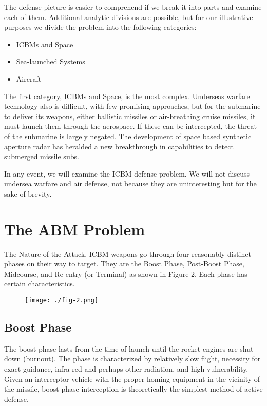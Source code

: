 The defense picture is easier to comprehend if we break it into parts and examine each of them. Additional analytic divisions are possible, but for our illustrative purposes we divide the problem into the following categories:
\begin{itemize}
    \item ICBMs and Space
    \item Sea-launched Systems
    \item Aircraft
\end{itemize}

The first category, ICBMs and Space, is the most complex. Underseas warfare technology also is difficult, with few promising approaches, but for the submarine to deliver its weapons, either ballistic missiles or air-breathing cruise missiles, it must launch them through the aerospace. If these can be intercepted, the threat of the submarine is largely negated. The development of space based synthetic aperture radar has heralded a new breakthrough in capabilities to detect submerged missile subs.

In any event, we will examine the ICBM defense problem. We will not discuss undersea warfare and air defense, not because they are uninteresting but for the sake of brevity.

\section{The ABM Problem}
The Nature of the Attack. ICBM weapons go through four reasonably distinct phases on their way to target. They are the Boost Phase, Post-Boost Phase, Midcourse, and Re-entry (or Terminal) as shown in Figure 2. Each phase has certain characteristics.

\begin{figure}[h!]
    \centering
    \texttt{[image: ./fig-2.png]}
    \label{fig:icbm-traj}
\end{figure}

\subsection{Boost Phase}
The boost phase lasts from the time of launch until the rocket engines are shut down (burnout). The phase is characterized by relatively slow flight, necessity for exact guidance, infra-red and perhaps other radiation, and high vulnerability. Given an interceptor vehicle with the proper homing equipment in the vicinity of the missile, boost phase interception is theoretically the simplest method of active defense.

